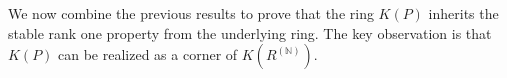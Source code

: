 \documentclass[11pt]{amsart}
\numberwithin{equation}{section}
\newtheorem{lma}{Lemma}[section]
\theoremstyle{definition}
\theoremstyle{plain}
\theoremstyle{definition}
\begin{document}


%

We now combine the previous results to prove that the ring $K(P)$ inherits the stable rank one property from the underlying ring. The key observation is that $K(P)$ can be realized as a corner of $K(R^{\mathbb{(N)}})$.
\end{document}
